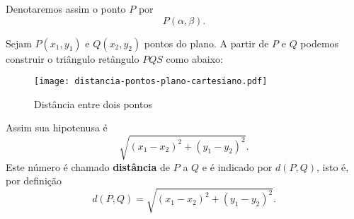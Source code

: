 Denotaremos assim o ponto $P$ por
\[
	P(\alpha,\beta).
\]

Sejam $P(x_1,y_1)$ e $Q(x_2,y_2)$ pontos do plano. A partir de $P$ e $Q$ podemos construir o tri\^angulo ret\^angulo $PQS$ como abaixo:
\begin{figure}[!h]
	\centering
	\caption{Dist\^ancia entre dois pontos}
	\texttt{[image: distancia-pontos-plano-cartesiano.pdf]}
\end{figure}

Assim sua hipotenusa \'e
\[
	\sqrt{(x_1 - x_2)^2 + (y_1 - y_2)^2}.
\]
Este n\'umero \'e chamado \textbf{dist\^ancia} de $P$ a $Q$ e \'e indicado por $d(P,Q)$, isto \'e, por defini\c{c}\~ao
\[
	d(P,Q) = \sqrt{(x_1 - x_2)^2 + (y_1 - y_2)^2}.
\]

